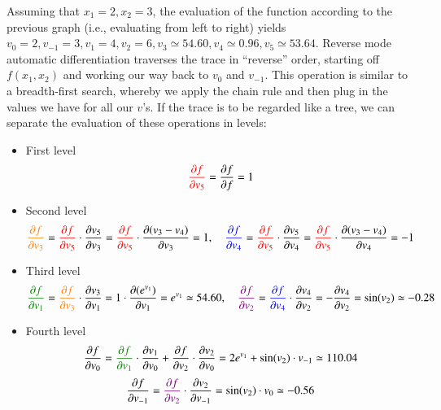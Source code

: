 \documentclass[12pt]{report} %
\newcommand{\tmcolor}[2]{{\color{#1}{#2}}}
\begin{document}
Assuming that $x_1 = 2, x_2 = 3$, the evaluation of the function according to
the previous graph (i.e., evaluating from left to right) yields $v_0 = 2, v_{-
      1} = 3, v_1 = 4, v_2 = 6, v_3 \simeq 54.60, v_4 \simeq 0.96, v_5 \simeq
  53.64$. Reverse mode automatic differentiation traverses the trace in
``reverse'' order, starting off $f (x_1, x_2)$ and working our way back to
$v_0$ and $v_{- 1}$. This operation is similar to a breadth-first search,
whereby we apply the chain rule and then plug in the values we have for all
our $v$'s. If the trace is to be regarded like a tree, we can separate the
evaluation of these operations in levels:
\begin{itemize}
  \item First level
        \[ \tmcolor{red}{\frac{\partial f}{\partial v_5}} = \frac{\partial
            f}{\partial f} = 1 \]
  \item Second level
        \[ \tmcolor{orange}{\frac{\partial f}{\partial v_3}} =
          \tmcolor{red}{\frac{\partial f}{\partial v_5}} \cdot \frac{\partial
            v_5}{\partial v_3} = \tmcolor{red}{\frac{\partial f}{\partial v_5}} \cdot
          \frac{\partial (v_3 - v_4)}{\partial v_3} = 1, \quad
          \tmcolor{blue}{\frac{\partial f}{\partial v_4}} =
          \tmcolor{red}{\frac{\partial f}{\partial v_5}} \cdot \frac{\partial
            v_5}{\partial v_4} = \tmcolor{red}{\frac{\partial f}{\partial v_5}} \cdot
          \frac{\partial (v_3 - v_4)}{\partial v_4} = - 1 \]
  \item Third level
        \[ {\color[HTML]{008000}\frac{\partial f}{\partial v_1}} =
          \tmcolor{orange}{\frac{\partial f}{\partial v_3}} \cdot \frac{\partial
            v_3}{\partial v_1} = 1 \cdot \frac{\partial (e^{v_1})}{\partial v_1} =
          e^{v_1} \simeq 54.60, \quad {\color[HTML]{800080}\frac{\partial
              f}{\partial v_2}} = \tmcolor{blue}{\frac{\partial f}{\partial v_4}} \cdot
          \frac{\partial v_4}{\partial v_2} = - \frac{\partial v_4}{\partial v_2} =
          \sin (v_2) \simeq - 0.28 \]
  \item Fourth level
        \[ \frac{\partial f}{\partial v_0} = {\color[HTML]{008000}\frac{\partial
            f}{\partial v_1}} \cdot \frac{\partial v_1}{\partial v_0} +
          \frac{\partial f}{\partial v_2} \cdot \frac{\partial v_2}{\partial v_0} =
          2 e^{v_1} + \sin (v_2) \cdot v_{- 1} \simeq 110.04 \]
        \[ \frac{\partial f}{\partial v_{- 1}} = {\color[HTML]{800080}\frac{\partial
                f}{\partial v_2}} \cdot \frac{\partial v_2}{\partial v_{- 1}} = \sin
          (v_2) \cdot v_0 \simeq - 0.56 \]
\end{itemize}
\end{document}
